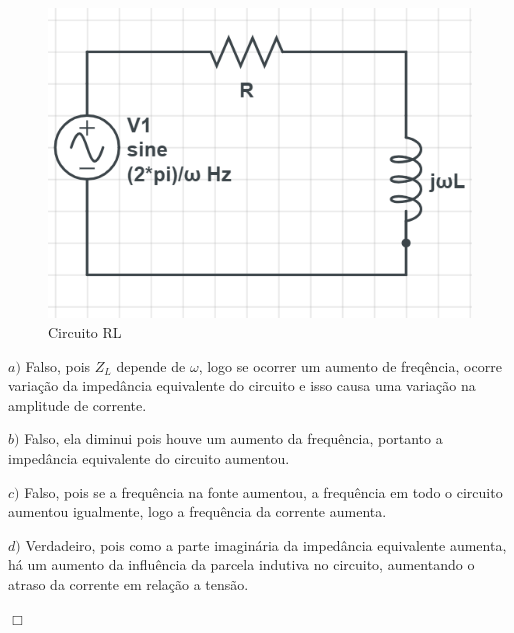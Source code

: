 \documentclass[
	12pt,				%
	oneside,			%
	a4paper,			%
	english,			%
	french,				%
	spanish,			%
	brazil				%
	]{abntex2}
\begin{document}
\begin{figure}[htb]
	\centering
	\includegraphics[scale=0.65]{circuito_3-39.png}
	\caption{Circuito RL}
\end{figure}

$a)$ Falso, pois {$Z_L$} depende de $\omega$, logo se ocorrer um aumento de freqência, ocorre variação da impedância equivalente do circuito e isso causa uma variação na amplitude de corrente.

$b)$ Falso, ela diminui pois houve um aumento da frequência, portanto a impedância equivalente do circuito aumentou.

$c)$ Falso, pois se a frequência na fonte aumentou, a frequência em todo o circuito aumentou igualmente, logo a frequência da corrente aumenta.

$d)$ Verdadeiro, pois como a parte imaginária da impedância equivalente aumenta, há um aumento da influência da parcela indutiva no circuito, aumentando o atraso da corrente em relação a tensão.

\begin{flushright}
    $\Box$
\end{flushright}
\newpage



\postextual


\end{document}
